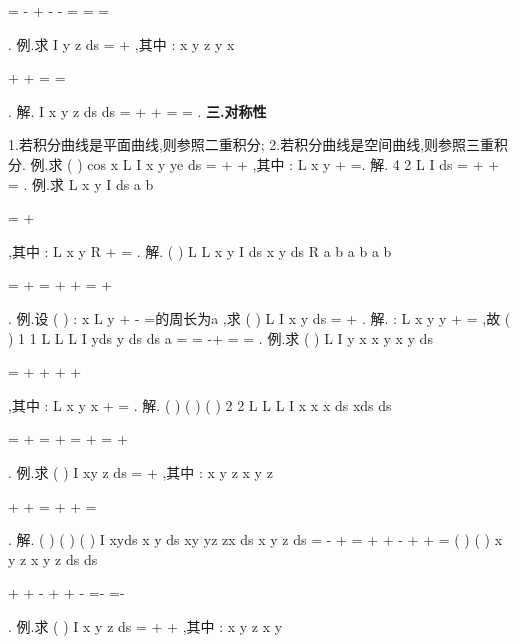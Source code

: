 =
-
+
-
-
=
\cdots 
=
\cdots 
\cdots 
=


\int 
\int 
\nabla 
\nabla 
. 
\textcolor{lyred}{例}.求
I
y
z ds
\Gamma 
=
+
\int \nabla 
,其中
: x
y
z
y
x

+
+
=
\Gamma 
=

. 
解.
I
x
y
z ds
ds
\pi 
\Gamma 
\Gamma 
=
+
+
=
\cdots 
=
\int 
\int 
\nabla 
\nabla 
. 
\vspace{4pt}
{\bfseries \textcolor{lyred}{三.对称性}}

1.若积分曲线是平面曲线,则参照二重积分; 
2.若积分曲线是空间曲线,则参照三重积分. 
\textcolor{lyred}{例}.求
(
)
cos
x
L
I
x
y
ye
ds
=
+
+
\int \nabla 
,其中
:
L x
y
+
=. 
解.
4 2
L
I
ds
=
+
+
\cdots 
=
\int \nabla 
. 
\textcolor{lyred}{例}.求
L
x
y
I
ds
a
b


=
+




\int \nabla 
,其中
:
L x
y
R
+
=
. 
解.
(
)
L
L
x
y
I
ds
x
y
ds
R
a
b
a
b
a
b
\pi 






=
+
=
+
+
=
+












\int 
\int 
\nabla 
\nabla 
. 
\textcolor{lyred}{例}.设
(
)
:
x
L
y
+
-
=的周长为a ,求
(
)
L
I
x
y
ds
=
+
\int \nabla 
. 
解.
:
L x
y
y
+
=
,故
(
)
1 1
L
L
L
I
yds
y
ds
ds
a
=
=
-+
=
=
\int 
\int 
\int 
\nabla 
\nabla 
\nabla 
. 
\textcolor{lyred}{例}.求
(
)
L
I
y
x
x
y
x
y
ds


=
+
+
+
+


\int \nabla 
,其中
:
L x
y
x
+
=
. 
解.
(
)
(
)
(
)
2 2
L
L
L
I
x
x
x ds
xds
ds
\pi 


=
+
=
+
=
+
=
+


\int 
\int 
\int 
\nabla 
\nabla 
\nabla 
. 
\textcolor{lyred}{例}.求
(
)
I
xy
z ds
\Gamma 
=
+
\int \nabla 
,其中
:
x
y
z
x
y
z

+
+
=
\Gamma +
+
=

. 
解.
(
)
(
)
(
)
I
xyds
x
y ds
xy
yz
zx ds
x
y
z ds
\Gamma 
\Gamma 
\Gamma 
\Gamma 
=
-
+
=
+
+
-
+
+
=
\int 
\int 
\int 
\int 
\nabla 
\nabla 
\nabla 
\nabla 
(
)
(
)
x
y
z
x
y
z
ds
ds
\pi 
\Gamma 
\Gamma 


+
+
-
+
+
-
=-
=-


\int 
\int 
\nabla 
\nabla 
. 
\textcolor{lyred}{例}.求
(
)
I
x
y
z ds
\Gamma 
=
+
+
\int \nabla 
,其中
:
x
y
z
x
y

